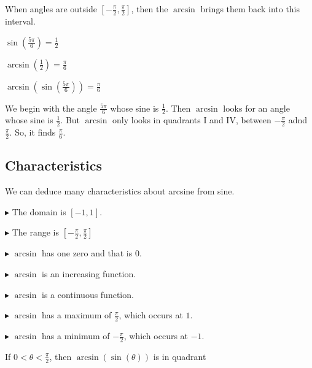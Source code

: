 \documentclass{ximera}
\begin{document}
When angles are outside $\left[-\frac{\pi}{2},\frac{\pi}{2}\right]$, then the $\arcsin$ brings them back into this interval.




\begin{example}



$\sin\left(\frac{5\pi}{6}\right) = \frac{1}{2}$

$\arcsin\left(\frac{1}{2}\right) = \frac{\pi}{6}$


$\arcsin\left(\sin\left(\frac{5\pi}{6}\right)\right) = \frac{\pi}{6}$




We begin with the angle $\frac{5\pi}{6}$ whose sine is $\frac{1}{2}$.  Then $\arcsin$ looks for an angle whose sine is $\frac{1}{2}$.  But $\arcsin$ only looks in quadrants I and IV, between $-\frac{\pi}{2}$ adnd $\frac{\pi}{2}$.  So, it finds $\frac{\pi}{6}$.


\end{example}









\subsection*{Characteristics} 

We can deduce many characteristics about arcsine from sine.


$\blacktriangleright$ The domain is  $[-1, 1]$.


$\blacktriangleright$ The range is $\left[ -\frac{\pi}{2}, \frac{\pi}{2} \right]$


$\blacktriangleright$ $\arcsin$ has one zero and that is $0$.


$\blacktriangleright$ $\arcsin$ is an increasing function.

$\blacktriangleright$ $\arcsin$ is a continuous function.

$\blacktriangleright$ $\arcsin$ has a maximum of $\frac{\pi}{2}$, which occurs at $1$.

$\blacktriangleright$ $\arcsin$ has a minimum of $-\frac{\pi}{2}$, which occurs at $-1$.



\begin{question}


If $0 < \theta < \frac{\pi}{2}$, then $\arcsin(\sin(\theta))$ is in quadrant

\begin{multipleChoice}
\end{multipleChoice}

\end{question}
\end{document}
